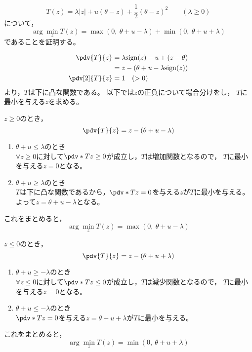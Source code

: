 \documentclass[class=jsarticle, crop=false, dvipdfmx, fleqn]{standalone}
\begin{document}
\section{}

\begin{equation}
    T(z) = \lambda |z| + u (\theta - z) + \frac{1}{2} (\theta - z) ^2
    \qquad (\lambda \ge 0)
\end{equation}
について，
\begin{equation}
    \arg\min_z T(z) = \max(0,\ \theta + u - \lambda) + \min(0,\ \theta + u + \lambda)
\end{equation}
であることを証明する。

\begin{align}
    \pdv{T}{z}
        & = \lambda \mathrm{sign}(z) - u + (z - \theta) \\
        & = z - (\theta + u - \lambda \mathrm{sign}(z)) \\
    \pdv[2]{T}{z} & = 1 \quad (> 0)
\end{align}
より，\(T\)は下に凸な関数である。
以下では\(z\)の正負について場合分けをし，
\(T\)に最小を与える\(z\)を求める。

\(z \ge 0\)のとき，
\begin{equation}
    \pdv{T}{z} = z - (\theta + u - \lambda)
\end{equation}
\begin{enumerate}
    \item \(\theta + u \le \lambda\)のとき \\
        \(\forall z \ge 0\)に対して\(\pdv*{T}{z} \ge 0\)が成立し，\(T\)は増加関数となるので，
        \(T\)に最小を与える\(z = 0\)となる。
    \item \(\theta + u \ge \lambda\)のとき \\
        \(T\)は下に凸な関数であるから，\(\pdv*{T}{z} = 0\)を与える\(z\)が\(T\)に最小を与える。
        よって\(z = \theta + u - \lambda\)となる。
\end{enumerate}
これをまとめると，
\begin{equation}
    \arg\min_z T(z) = \max(0,\ \theta + u - \lambda)
\end{equation}

\(z \le 0\)のとき，
\begin{equation}
    \pdv{T}{z} = z - (\theta + u + \lambda)
\end{equation}
\begin{enumerate}
    \item \(\theta + u \ge -\lambda\)のとき \\
        \(\forall z \le 0\)に対して\(\pdv*{T}{z} \le 0\)が成立し，\(T\)は減少関数となるので，
        \(T\)に最小を与える\(z = 0\)となる。
    \item \(\theta + u \le -\lambda\)のとき \\
        \(\pdv*{T}{z} = 0\)を与える\(z = \theta + u + \lambda\)が\(T\)に最小を与える。
\end{enumerate}
これをまとめると，
\begin{equation}
    \arg\min_z T(z) = \min(0,\ \theta + u + \lambda)
\end{equation}
\end{document}
